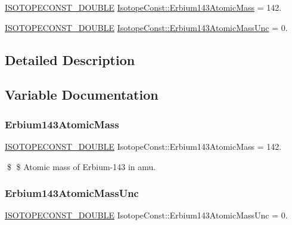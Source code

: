 \begin{DoxyCompactItemize}
\item 
\mbox{\hyperlink{group___isotope_const-_macros_ga8f45a7272ce02c0b4c65c44636ed719a}{I\+S\+O\+T\+O\+P\+E\+C\+O\+N\+S\+T\+\_\+\+D\+O\+U\+B\+LE}} \mbox{\hyperlink{group___isotope_const-_erbium-_er143_ga98a053db19a14da56ae0a248d5c1c5a7}{Isotope\+Const\+::\+Erbium143\+Atomic\+Mass}} = 142.
\item 
\mbox{\hyperlink{group___isotope_const-_macros_ga8f45a7272ce02c0b4c65c44636ed719a}{I\+S\+O\+T\+O\+P\+E\+C\+O\+N\+S\+T\+\_\+\+D\+O\+U\+B\+LE}} \mbox{\hyperlink{group___isotope_const-_erbium-_er143_ga62c696290a0fecddeda34f05186b657f}{Isotope\+Const\+::\+Erbium143\+Atomic\+Mass\+Unc}} = 0.
\end{DoxyCompactItemize}


\subsection{Detailed Description}


\subsection{Variable Documentation}
\mbox{\label{group___isotope_const-_erbium-_er143_ga98a053db19a14da56ae0a248d5c1c5a7}} 
\subsubsection{\texorpdfstring{Erbium143\+Atomic\+Mass}{Erbium143AtomicMass}}
{\footnotesize\ttfamily \mbox{\hyperlink{group___isotope_const-_macros_ga8f45a7272ce02c0b4c65c44636ed719a}{I\+S\+O\+T\+O\+P\+E\+C\+O\+N\+S\+T\+\_\+\+D\+O\+U\+B\+LE}} Isotope\+Const\+::\+Erbium143\+Atomic\+Mass = 142.}

\$ \$ Atomic mass of Erbium-\/143 in amu. \mbox{\label{group___isotope_const-_erbium-_er143_ga62c696290a0fecddeda34f05186b657f}} 
\subsubsection{\texorpdfstring{Erbium143\+Atomic\+Mass\+Unc}{Erbium143AtomicMassUnc}}
{\footnotesize\ttfamily \mbox{\hyperlink{group___isotope_const-_macros_ga8f45a7272ce02c0b4c65c44636ed719a}{I\+S\+O\+T\+O\+P\+E\+C\+O\+N\+S\+T\+\_\+\+D\+O\+U\+B\+LE}} Isotope\+Const\+::\+Erbium143\+Atomic\+Mass\+Unc = 0.}

